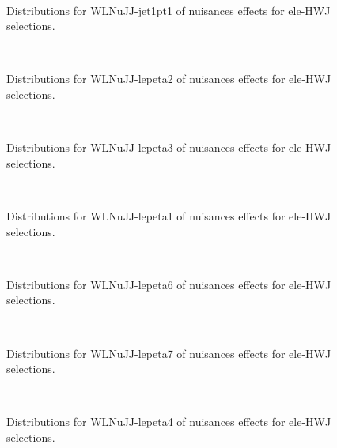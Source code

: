 \begin{figure}[htbp]  
\centering 
\\ 
\caption{ 
   Distributions for WLNuJJ-jet1pt1 of nuisances effects for ele-HWJ selections.
} 
\label{fig:WLNuJJ_jet1pt1_ele_HWJ} 
\end{figure} 




\begin{figure}[htbp]  
\centering 
\\ 
\caption{ 
   Distributions for WLNuJJ-lepeta2 of nuisances effects for ele-HWJ selections.
} 
\label{fig:WLNuJJ_lepeta2_ele_HWJ} 
\end{figure} 




\begin{figure}[htbp]  
\centering 
\\ 
\caption{ 
   Distributions for WLNuJJ-lepeta3 of nuisances effects for ele-HWJ selections.
} 
\label{fig:WLNuJJ_lepeta3_ele_HWJ} 
\end{figure} 




\begin{figure}[htbp]  
\centering 
\\ 
\caption{ 
   Distributions for WLNuJJ-lepeta1 of nuisances effects for ele-HWJ selections.
} 
\label{fig:WLNuJJ_lepeta1_ele_HWJ} 
\end{figure} 




\begin{figure}[htbp]  
\centering 
\\ 
\caption{ 
   Distributions for WLNuJJ-lepeta6 of nuisances effects for ele-HWJ selections.
} 
\label{fig:WLNuJJ_lepeta6_ele_HWJ} 
\end{figure} 




\begin{figure}[htbp]  
\centering 
\\ 
\caption{ 
   Distributions for WLNuJJ-lepeta7 of nuisances effects for ele-HWJ selections.
} 
\label{fig:WLNuJJ_lepeta7_ele_HWJ} 
\end{figure} 




\begin{figure}[htbp]  
\centering 
\\ 
\caption{ 
   Distributions for WLNuJJ-lepeta4 of nuisances effects for ele-HWJ selections.
} 
\label{fig:WLNuJJ_lepeta4_ele_HWJ} 
\end{figure} 




